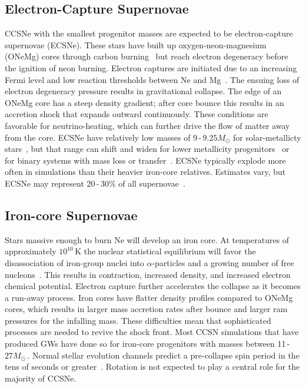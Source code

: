 \subsection{Electron-Capture Supernovae}

CCSNe with the smallest progenitor masses are expected to be electron-capture supernovae (ECSNe). These stars have built up oxygen-neon-magnesium (ONeMg) cores through carbon burning~\cite{nomoto1984evolution, nomoto1987evolution, poelarends2008supernova} but reach electron degeneracy before the ignition of neon burning. Electron captures are initiated due to an increasing Fermi level and low reaction thresholds between Ne and Mg~\cite{janka}. The ensuing loss of electron degeneracy pressure results in gravitational collapse. The edge of an ONeMg core has a steep density gradient; after core bounce this results in an accretion shock that expands outward continuously. These conditions are favorable for neutrino-heating, which can further drive the flow of matter away from the core. ECSNe have relatively low masses of 9\,-\,$9.25M_\odot$ for solar-metallicty stars~\cite{poelarends2008supernova}, but that range can shift and widen for lower metallicity progenitors~\cite{pumo2009ec} or for binary systems with mass loss or transfer~\cite{podsiadlowski2004effects}. ECSNe typically explode more often in simulations than their heavier iron-core relatives. Estimates vary, but ECSNe may represent 20\,-\,30\% of all supernovae~\cite{wanajo2009nucleosynthesis, wanajo2010electron}.

\subsection{Iron-core Supernovae}

Stars massive enough to burn Ne will develop an iron core. At temperatures of approximately $10^{10}$\,K the nuclear statistical equilibrium will favor the disassociation of iron-group nuclei into $\alpha$-particles and a growing number of free nucleons~\cite{janka}. This results in contraction, increased density, and increased electron chemical potential. Electron capture further accelerates the collapse as it becomes a run-away process. Iron cores have flatter density profiles compared to ONeMg cores, which results in larger mass accretion rates after bounce and larger ram pressures for the infalling mass. These difficulties mean that sophisticated processes are needed to revive the shock front. Most CCSN simulations that have produced GWs have done so for iron-core progenitors with masses between 11\,-\,$27M_\odot$\,. Normal stellar evolution channels predict a pre-collapse spin period in the tens of seconds or greater~\cite{heger2005presupernova}. Rotation is not expected to play a central role for the majority of CCSNe.

